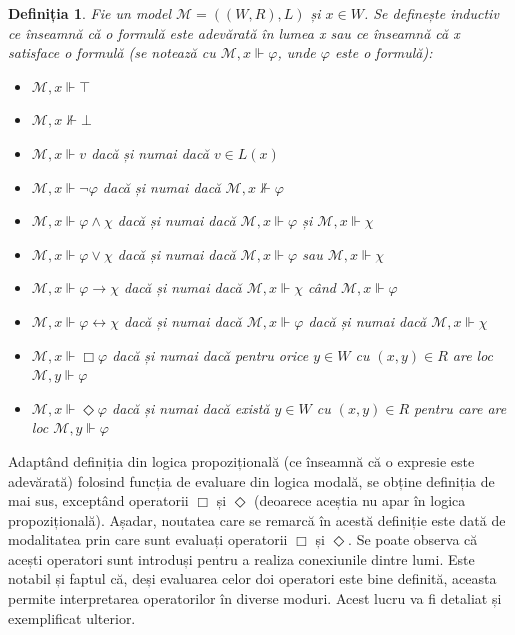 \documentclass[12pt, openany]{book}
\newtheorem{definition}{Definiția}[chapter] %
\begin{document}
            \begin{definition}
                Fie un model $\mathcal{M} = ((W, R), L)$ și $x \in W$. Se definește inductiv ce înseamnă că o formulă 
                este adevărată în lumea x sau ce înseamnă că x satisface o formulă (se notează cu $\mathcal{M},x \Vdash 
                \varphi$, unde $\varphi$ este o formulă):
                \begin{itemize}
                    \item $\mathcal{M},x \Vdash \top$
                    \item $\mathcal{M},x \nVdash \bot$
                    \item $\mathcal{M},x \Vdash v$ dacă și numai dacă $v \in L(x)$
                    \item $\mathcal{M},x \Vdash \neg\varphi$ dacă și numai dacă $\mathcal{M},x \nVdash \varphi$
                    \item $\mathcal{M},x \Vdash \varphi \wedge \chi$ dacă și numai dacă $\mathcal{M},x \Vdash \varphi$ și $\mathcal{M},x \Vdash \chi$
                    \item $\mathcal{M},x \Vdash \varphi \vee \chi$ dacă și numai dacă $\mathcal{M},x \Vdash \varphi$ sau $\mathcal{M},x \Vdash \chi$
                    \item $\mathcal{M},x \Vdash \varphi \rightarrow \chi$ dacă și numai dacă $\mathcal{M},x \Vdash \chi$ când $\mathcal{M},x \Vdash \varphi$
                    \item $\mathcal{M},x \Vdash \varphi \leftrightarrow \chi$ dacă și numai dacă $\mathcal{M},x \Vdash \varphi$ dacă și numai dacă 
                    $\mathcal{M},x \Vdash \chi$
                    \item $\mathcal{M},x \Vdash \Box\varphi$ dacă și numai dacă pentru orice $y \in W$ cu $(x,y) \in R$ are loc $\mathcal{M},y \Vdash \varphi$ 
                    \item $\mathcal{M},x \Vdash \Diamond\varphi$ dacă și numai dacă există $y \in W$ cu $(x,y) \in R$ pentru care are loc $\mathcal{M},y \Vdash \varphi$
                \end{itemize}
            \end{definition}

            \par{}
                Adaptând definiția din logica propozițională (ce înseamnă că o expresie este adevărată) folosind funcția de evaluare din logica modală,
                se obține definiția de mai sus, exceptând operatorii $\Box$ și $\Diamond$ (deoarece aceștia nu apar în logica propozițională). 
                Așadar, noutatea care se remarcă în acestă definiție este dată de modalitatea prin care sunt evaluați operatorii $\Box$ 
                și $\Diamond$. Se poate observa că acești operatori sunt introduși pentru a realiza conexiunile dintre lumi. 
                Este notabil și faptul că, deși evaluarea celor doi operatori este bine definită, aceasta permite interpretarea 
                operatorilor în diverse moduri. Acest lucru va fi detaliat și exemplificat ulterior.
\end{document}
